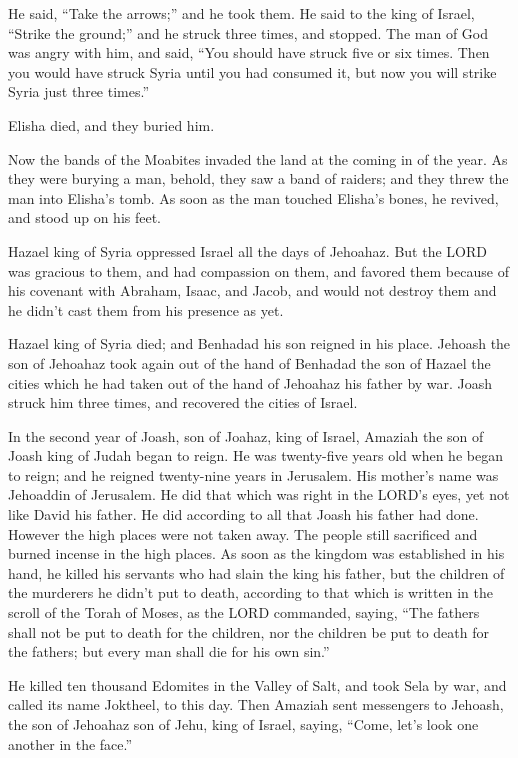 \myverse{}He said, “Take the arrows;” and he took them. He said to the
king of Israel, “Strike the ground;” and he struck three times, and stopped.
\myverse{}The man of God was angry with him, and said, “You should have struck five
or six times. Then you would have struck Syria until you had consumed it, but now you will strike Syria
just three times.”

\myverse{}Elisha died, and they buried him.

Now the bands of the Moabites invaded the land at the coming in of the year.
\myverse{}As they were burying a man, behold, they saw a band of raiders; and they
threw the man into Elisha’s tomb. As soon as the man touched Elisha’s bones, he revived, and stood up
on his feet.

\myverse{}Hazael king of Syria oppressed Israel all the days of Jehoahaz.
\myverse{}But the LORD was gracious to them, and had compassion on them, and favored
them because of his covenant with Abraham, Isaac, and Jacob, and would not destroy them and he didn’t
cast them from his presence as yet.

\myverse{}Hazael king of Syria died; and Benhadad his son reigned in his
place.
\myverse{}Jehoash the son of Jehoahaz took again out of the hand of Benhadad the son
of Hazael the cities which he had taken out of the hand of Jehoahaz his father by war. Joash struck him
three times, and recovered the cities of Israel.


\mychapter{} \myverse*{}In the second year of Joash, son of Joahaz, king of Israel, Amaziah
the son of Joash king of Judah began to reign.
\myverse{}He was twenty-five years old when he began to reign; and he reigned twenty-nine
years in Jerusalem. His mother’s name was Jehoaddin of Jerusalem.
\myverse{}He did that which was right in the LORD’s eyes, yet not like David his father.
He did according to all that Joash his father had done.
\myverse{}However the high places were not taken away. The people still sacrificed and
burned incense in the high places.
\myverse{}As soon as the kingdom was established in his hand, he killed his servants
who had slain the king his father,
\myverse{}but the children of the murderers he didn’t put to death, according to that
which is written in the scroll of the Torah of Moses, as the LORD commanded, saying, “The fathers shall
not be put to death for the children, nor the children be put to death for the fathers; but every man
shall die for his own sin.”

\myverse{}He killed ten thousand Edomites in the Valley of Salt, and took
Sela by war, and called its name Joktheel, to this day.
\myverse{}Then Amaziah sent messengers to Jehoash, the son of Jehoahaz son of Jehu, king
of Israel, saying, “Come, let’s look one another in the face.”


